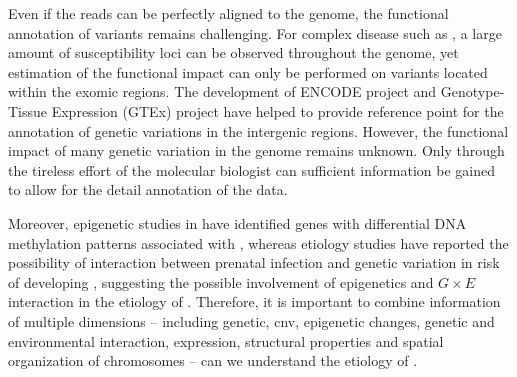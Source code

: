 \documentclass[12pt]{scrbook}
\newcommand*{\glng}{\glsentrylong}
\begin{document}
	Even if the reads can be perfectly aligned to the genome, the functional annotation of variants remains challenging.
	For complex disease such as \glng{scz}, a large amount of susceptibility loci can be observed throughout the genome, yet estimation of the functional impact can only be performed on variants located within the exomic regions.
	The development of ENCODE project \citep{ENCODEProjectConsortium2012} and Genotype-Tissue Expression (GTEx) project \citep{Consortium2015} have helped to provide reference point for the annotation of genetic variations in the intergenic regions.
	However, the functional impact of many genetic variation in the genome remains unknown. 
	Only through the tireless effort of the molecular biologist can sufficient information be gained to allow for the detail annotation of the data.

	Moreover, epigenetic studies in \glng{scz} \citep{Wockner2014,Nishioka2012} have identified genes with differential DNA methylation patterns associated with \glng{scz}, whereas etiology studies have reported the possibility of interaction between prenatal infection and genetic variation in risk of developing \glng{scz} \citep{Tienari2004,Clarke2009}, suggesting the possible involvement of epigenetics and $G\times E$ interaction in the etiology of \glng{scz}.
	Therefore, it is important to combine information of multiple dimensions -- including genetic, \gls{cnv}, epigenetic changes, genetic and environmental interaction, expression, structural properties and spatial organization of chromosomes --  can we understand the etiology of \glng{scz}.
		

	
	
\end{document}
